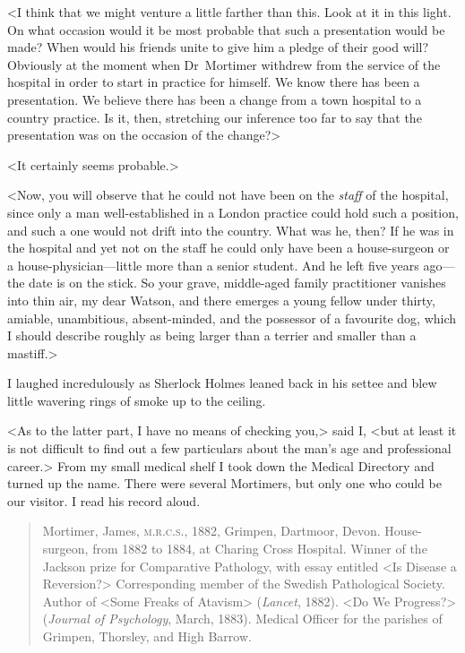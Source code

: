 <I think that we might venture a little farther than this. Look at it in this light. On what occasion would it be most probable that such a presentation would be made? When would his friends unite to give him a pledge of their good will? Obviously at the moment when Dr~Mortimer withdrew from the service of the hospital in order to start in practice for himself. We know there has been a presentation. We believe there has been a change from a town hospital to a country practice. Is it, then, stretching our inference too far to say that the presentation was on the occasion of the change?>

<It certainly seems probable.>

<Now, you will observe that he could not have been on the \emph{staff} of the hospital, since only a man well-established in a London practice could hold such a position, and such a one would not drift into the country. What was he, then? If he was in the hospital and yet not on the staff he could only have been a house-surgeon or a house-physician—little more than a senior student. And he left five years ago—the date is on the stick. So your grave, middle-aged family practitioner vanishes into thin air, my dear Watson, and there emerges a young fellow under thirty, amiable, unambitious, absent-minded, and the possessor of a favourite dog, which I should describe roughly as being larger than a terrier and smaller than a mastiff.>

I laughed incredulously as Sherlock Holmes leaned back in his settee and blew little wavering rings of smoke up to the ceiling.

<As to the latter part, I have no means of checking you,> said I, <but at least it is not difficult to find out a few particulars about the man's age and professional career.> From my small medical shelf I took down the Medical Directory and turned up the name. There were several Mortimers, but only one who could be our visitor. I read his record aloud.

\begin{quote}Mortimer, James, \textsc{m.r.c.s.}, 1882, Grimpen, Dartmoor, Dev\-on. House-surgeon, from 1882 to 1884, at Charing Cross Hospital. Winner of the Jackson prize for Comparative Pathology, with essay entitled <Is Disease a Reversion?> Corresponding member of the Swedish Pathological Society. Author of <Some Freaks of Atavism> (\textit{Lancet}, 1882). <Do We Progress?> (\textit{Journal of Psychology}, March, 1883). Medical Officer for the parishes of Grimpen, Thorsley, and High Barrow.\end{quote}

